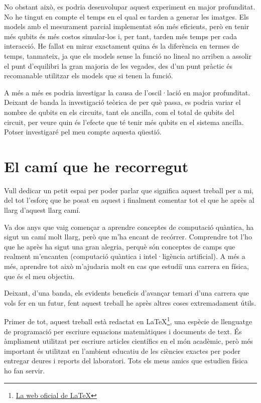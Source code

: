 No obstant això, es podria desenvolupar aquest experiment en major profunditat. No he tingut en compte el temps en el qual es tarden a generar les imatges. Els models amb el mesurament parcial implementat són més eficients, però en tenir més qubits és més costos simular-los i, per tant, tarden més temps per cada interacció. He fallat en mirar exactament quina és la diferència en termes de temps, tanmateix, ja que els models sense la funció no lineal no arriben a assolir el punt d'equilibri la gran majoria de les vegades, des d'un punt pràctic és recomanable utilitzar els models que si tenen la funció. 

A més a més es podria investigar la causa de l'oscil·lació en major profunditat. Deixant de banda la investigació teòrica de per què passa, es podria variar el nombre de qubits en els circuits, tant els ancilla, com el total de qubits del circuit, per veure quin és l'efecte que té tenir més qubits en el sistema ancilla. Potser investigaré pel meu compte aquesta qüestió. 

\section*{El camí que he recorregut}
Vull dedicar un petit espai per poder parlar que significa aquest treball per a mi, del tot l'esforç que he posat en aquest i finalment comentar tot el que he après al llarg d'aquest llarg camí.

Va dos anys que vaig començar a aprendre conceptes de computació quàntica, ha sigut un camí molt llarg, però que m'ha encant de recórrer. Comprendre tot l'ho que he après ha sigut una gran alegria, perquè són conceptes de camps que realment m'encanten (computació quàntica i intel·ligència artificial). A més a més, aprendre tot això m'ajudaria molt en cas que estudiï una carrera en física, que és el meu objectiu.

Deixant, d'una banda, els evidents beneficis d'avançar temari d'una carrera que vols fer en un futur, fent aquest treball he après altres coses extremadament útils.

Primer de tot, aquest treball està redactat en \LaTeX\footnote{\href{https://www.latex-project.org/}{La web oficial de \LaTeX}}, una espècie de llenguatge de programació per escriure equacions matemàtiques i documents de text. És àmpliament utilitzat per escriure articles científics en el món acadèmic, però més important és utilitzat en l'ambient educatiu de les ciències exactes per poder entregar deures i reports del laboratori. Tots els meus amics que estudien física ho fan servir.

